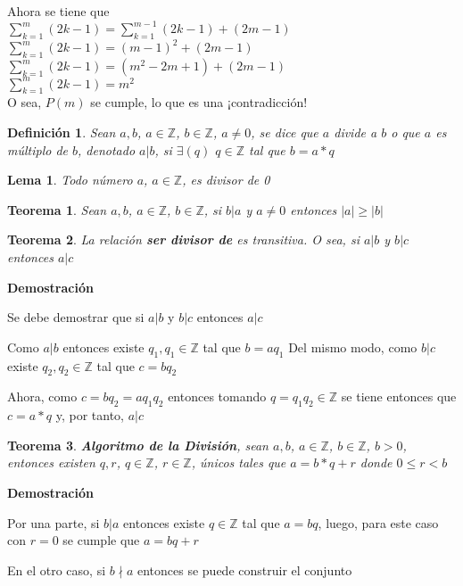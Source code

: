 \documentclass[a4paper,1pt]{report}
\newtheorem*{teo}{Teorema}
\newtheorem*{dfn}{Definición}
\newtheorem*{lem}{Lema}
\begin{document}
Ahora se tiene que\\ 
$\sum^m_{k=1}(2k-1)=\sum^{m-1}_{k=1}(2k-1)+(2m-1)$\\
$\sum^m_{k=1}(2k-1)=(m-1)^2+(2m-1)$\\
$\sum^m_{k=1}(2k-1)=(m^2-2m+1)+(2m-1)$\\
$\sum^m_{k=1}(2k-1)=m^2$\\
O sea, $P(m)$ se cumple, lo que es una ¡contradicción!

\begin{dfn}
 Sean $a,b$, $a\in\mathbb{Z}$, $b\in\mathbb{Z}$, $a\neq 0$, se dice que $a$ divide a $b$ o que $a$ es múltiplo de $b$, denotado $a|b$, si $\exists(q)$ $q\in\mathbb{Z}$ tal que $b=a*q$
\end{dfn}

\begin{lem}
 Todo número $a$, $a\in\mathbb{Z}$, es divisor de 0
\end{lem}

\begin{teo}
 Sean $a,b$, $a\in\mathbb{Z}$, $b\in\mathbb{Z}$, si $b|a$ y $a\neq 0$ entonces $|a| \geq |b|$
\end{teo}



\begin{teo}
 La relación \textbf{ser divisor de} es transitiva. O sea, si $a|b$ y $b|c$ entonces $a|c$
\end{teo}

\textbf{Demostración}

Se debe demostrar que si $a|b$ y $b|c$ entonces $a|c$

Como $a|b$ entonces existe $q_1, q_1\in\mathbb{Z}$ tal que $b=aq_1$
Del mismo modo, como $b|c$ existe $q_2, q_2\in\mathbb{Z}$ tal que $c=bq_2$

Ahora, como $c=bq_2=aq_1q_2$ entonces tomando $q=q_1q_2\in\mathbb{Z}$ se tiene entonces que $c=a*q$ y, por tanto, $a|c$ 

\begin{teo}
 \textbf{Algoritmo de la División}, sean $a,b$, $a\in\mathbb{Z}$, $b\in\mathbb{Z}$, $b > 0$, entonces existen $q,r$, $q\in\mathbb{Z}$, $r\in\mathbb{Z}$, únicos tales que $a = b*q+r$ donde $0\leq r < b$
\end{teo}

\textbf{Demostración}

Por una parte, si $b|a$ entonces existe $q\in\mathbb{Z}$ tal que $a=bq$, luego, para este caso con $r=0$ se cumple que $a=bq+r$

En el otro caso, si $b\nmid a$ entonces se puede construir el conjunto 
\end{document}
